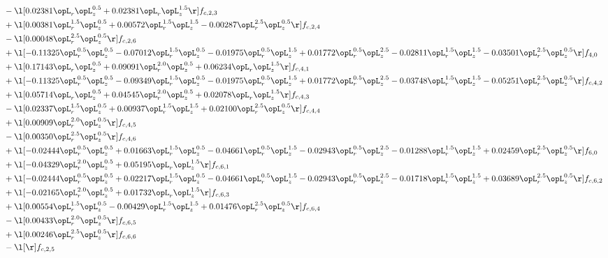 \begin{alignat}{2}
& - \l[  0.02381 \opL_r \opL_z^{0.5} +  0.02381 \opL_r \opL_z^{1.5}  \r] f_{c,2,3} \nonumber \\ 
& + \l[  0.00381 \opL_r^{1.5} \opL_z^{0.5} +  0.00572 \opL_r^{1.5} \opL_z^{1.5}   -0.00287 \opL_r^{2.5} \opL_z^{0.5}  \r] f_{c,2,4} \nonumber \\ 
& - \l[  0.00048 \opL_r^{2.5} \opL_z^{0.5}  \r] f_{c,2,6} \nonumber \\ 
& + \l[  -0.11325 \opL_r^{0.5} \opL_z^{0.5}   -0.07012 \opL_r^{1.5} \opL_z^{0.5}   -0.01975 \opL_r^{0.5} \opL_z^{1.5} +  0.01772 \opL_r^{0.5} \opL_z^{2.5}   -0.02811 \opL_r^{1.5} \opL_z^{1.5}   -0.03501 \opL_r^{2.5} \opL_z^{0.5}  \r] f_{4,0} \nonumber \\ 
& + \l[  0.17143 \opL_r \opL_z^{0.5} +  0.09091 \opL_r^{2.0} \opL_z^{0.5} +  0.06234 \opL_r \opL_z^{1.5}  \r] f_{c,4,1} \nonumber \\ 
& + \l[  -0.11325 \opL_r^{0.5} \opL_z^{0.5}   -0.09349 \opL_r^{1.5} \opL_z^{0.5}   -0.01975 \opL_r^{0.5} \opL_z^{1.5} +  0.01772 \opL_r^{0.5} \opL_z^{2.5}   -0.03748 \opL_r^{1.5} \opL_z^{1.5}   -0.05251 \opL_r^{2.5} \opL_z^{0.5}  \r] f_{c,4,2} \nonumber \\ 
& + \l[  0.05714 \opL_r \opL_z^{0.5} +  0.04545 \opL_r^{2.0} \opL_z^{0.5} +  0.02078 \opL_r \opL_z^{1.5}  \r] f_{c,4,3} \nonumber \\ 
& - \l[  0.02337 \opL_r^{1.5} \opL_z^{0.5} +  0.00937 \opL_r^{1.5} \opL_z^{1.5} +  0.02100 \opL_r^{2.5} \opL_z^{0.5}  \r] f_{c,4,4} \nonumber \\ 
& + \l[  0.00909 \opL_r^{2.0} \opL_z^{0.5}  \r] f_{c,4,5} \nonumber \\ 
& - \l[  0.00350 \opL_r^{2.5} \opL_z^{0.5}  \r] f_{c,4,6} \nonumber \\ 
& + \l[  -0.02444 \opL_r^{0.5} \opL_z^{0.5} +  0.01663 \opL_r^{1.5} \opL_z^{0.5}   -0.04661 \opL_r^{0.5} \opL_z^{1.5}   -0.02943 \opL_r^{0.5} \opL_z^{2.5}   -0.01288 \opL_r^{1.5} \opL_z^{1.5} +  0.02459 \opL_r^{2.5} \opL_z^{0.5}  \r] f_{6,0} \nonumber \\ 
& + \l[  -0.04329 \opL_r^{2.0} \opL_z^{0.5} +  0.05195 \opL_r \opL_z^{1.5}  \r] f_{c,6,1} \nonumber \\ 
& + \l[  -0.02444 \opL_r^{0.5} \opL_z^{0.5} +  0.02217 \opL_r^{1.5} \opL_z^{0.5}   -0.04661 \opL_r^{0.5} \opL_z^{1.5}   -0.02943 \opL_r^{0.5} \opL_z^{2.5}   -0.01718 \opL_r^{1.5} \opL_z^{1.5} +  0.03689 \opL_r^{2.5} \opL_z^{0.5}  \r] f_{c,6,2} \nonumber \\ 
& + \l[  -0.02165 \opL_r^{2.0} \opL_z^{0.5} +  0.01732 \opL_r \opL_z^{1.5}  \r] f_{c,6,3} \nonumber \\ 
& + \l[  0.00554 \opL_r^{1.5} \opL_z^{0.5}   -0.00429 \opL_r^{1.5} \opL_z^{1.5} +  0.01476 \opL_r^{2.5} \opL_z^{0.5}  \r] f_{c,6,4} \nonumber \\ 
& - \l[  0.00433 \opL_r^{2.0} \opL_z^{0.5}  \r] f_{c,6,5} \nonumber \\ 
& + \l[  0.00246 \opL_r^{2.5} \opL_z^{0.5}  \r] f_{c,6,6} \nonumber \\ 
& - \l[  \r] f_{c,2,5} \nonumber \\ 
\end{alignat} 


